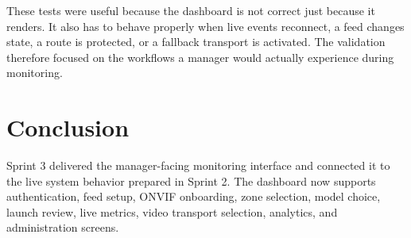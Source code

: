 These tests were useful because the dashboard is not correct just because it renders. It also has to behave properly when live events reconnect, a feed changes state, a route is protected, or a fallback transport is activated. The validation therefore focused on the workflows a manager would actually experience during monitoring.

\section{Conclusion}
Sprint 3 delivered the manager-facing monitoring interface and connected it to the live system behavior prepared in Sprint 2. The dashboard now supports authentication, feed setup, ONVIF onboarding, zone selection, model choice, launch review, live metrics, video transport selection, analytics, and administration screens.

